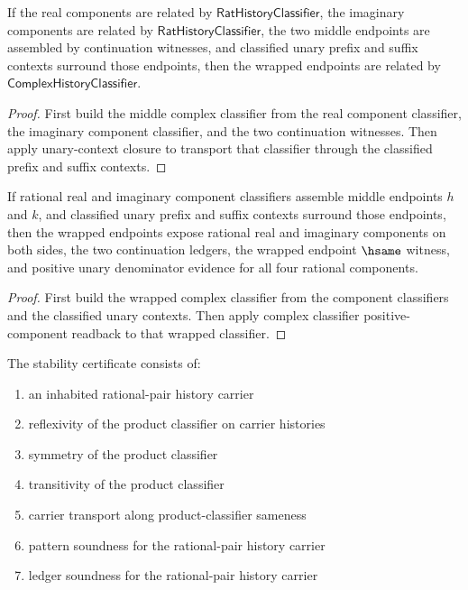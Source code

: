 \begin{theorem}
\label{thm:complex-history-classifier-component-classifier-unary-context-intro}
If the real components are related by $\mathsf{RatHistoryClassifier}$, the
imaginary components are related by $\mathsf{RatHistoryClassifier}$, the two
middle endpoints are assembled by continuation witnesses, and classified unary
prefix and suffix contexts surround those endpoints, then the wrapped endpoints
are related by $\mathsf{ComplexHistoryClassifier}$.
\end{theorem}
\begin{proof}
First build the middle complex classifier from the real component classifier,
the imaginary component classifier, and the two continuation witnesses. Then
apply unary-context closure to transport that classifier through the classified
prefix and suffix contexts.
\end{proof}

\begin{theorem}
\label{thm:complex-history-classifier-component-classifier-unary-context-positive-components}
If rational real and imaginary component classifiers assemble middle endpoints
\(h\) and \(k\), and classified unary prefix and suffix contexts surround
those endpoints, then the wrapped endpoints expose rational real and imaginary
components on both sides, the two continuation ledgers, the wrapped endpoint
\(\hsame\) witness, and positive unary denominator evidence for all four
rational components.
\end{theorem}
\begin{proof}
First build the wrapped complex classifier from the component classifiers and
the classified unary contexts. Then apply complex classifier positive-component
readback to that wrapped classifier.
\end{proof}

\begin{definition}
\label{def:complex-stability-certificate}
The stability certificate consists of:
\begin{enumerate}
  \item an inhabited rational-pair history carrier
  \item reflexivity of the product classifier on carrier histories
  \item symmetry of the product classifier
  \item transitivity of the product classifier
  \item carrier transport along product-classifier sameness
  \item pattern soundness for the rational-pair history carrier
  \item ledger soundness for the rational-pair history carrier
\end{enumerate}
\end{definition}

